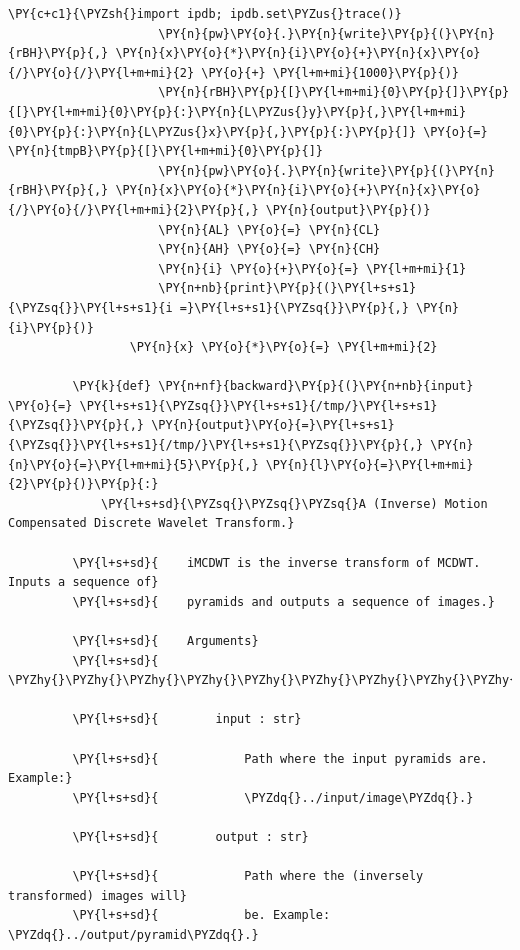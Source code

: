 {\begin{Verbatim}[commandchars=\\\{\}]
                     \PY{c+c1}{\PYZsh{}import ipdb; ipdb.set\PYZus{}trace()}
                     \PY{n}{pw}\PY{o}{.}\PY{n}{write}\PY{p}{(}\PY{n}{rBH}\PY{p}{,} \PY{n}{x}\PY{o}{*}\PY{n}{i}\PY{o}{+}\PY{n}{x}\PY{o}{/}\PY{o}{/}\PY{l+m+mi}{2} \PY{o}{+} \PY{l+m+mi}{1000}\PY{p}{)}
                     \PY{n}{rBH}\PY{p}{[}\PY{l+m+mi}{0}\PY{p}{]}\PY{p}{[}\PY{l+m+mi}{0}\PY{p}{:}\PY{n}{L\PYZus{}y}\PY{p}{,}\PY{l+m+mi}{0}\PY{p}{:}\PY{n}{L\PYZus{}x}\PY{p}{,}\PY{p}{:}\PY{p}{]} \PY{o}{=} \PY{n}{tmpB}\PY{p}{[}\PY{l+m+mi}{0}\PY{p}{]}
                     \PY{n}{pw}\PY{o}{.}\PY{n}{write}\PY{p}{(}\PY{n}{rBH}\PY{p}{,} \PY{n}{x}\PY{o}{*}\PY{n}{i}\PY{o}{+}\PY{n}{x}\PY{o}{/}\PY{o}{/}\PY{l+m+mi}{2}\PY{p}{,} \PY{n}{output}\PY{p}{)}
                     \PY{n}{AL} \PY{o}{=} \PY{n}{CL}
                     \PY{n}{AH} \PY{o}{=} \PY{n}{CH}
                     \PY{n}{i} \PY{o}{+}\PY{o}{=} \PY{l+m+mi}{1}
                     \PY{n+nb}{print}\PY{p}{(}\PY{l+s+s1}{\PYZsq{}}\PY{l+s+s1}{i =}\PY{l+s+s1}{\PYZsq{}}\PY{p}{,} \PY{n}{i}\PY{p}{)}
                 \PY{n}{x} \PY{o}{*}\PY{o}{=} \PY{l+m+mi}{2}
         
         \PY{k}{def} \PY{n+nf}{backward}\PY{p}{(}\PY{n+nb}{input} \PY{o}{=} \PY{l+s+s1}{\PYZsq{}}\PY{l+s+s1}{/tmp/}\PY{l+s+s1}{\PYZsq{}}\PY{p}{,} \PY{n}{output}\PY{o}{=}\PY{l+s+s1}{\PYZsq{}}\PY{l+s+s1}{/tmp/}\PY{l+s+s1}{\PYZsq{}}\PY{p}{,} \PY{n}{n}\PY{o}{=}\PY{l+m+mi}{5}\PY{p}{,} \PY{n}{l}\PY{o}{=}\PY{l+m+mi}{2}\PY{p}{)}\PY{p}{:}
             \PY{l+s+sd}{\PYZsq{}\PYZsq{}\PYZsq{}A (Inverse) Motion Compensated Discrete Wavelet Transform.}
         
         \PY{l+s+sd}{    iMCDWT is the inverse transform of MCDWT. Inputs a sequence of}
         \PY{l+s+sd}{    pyramids and outputs a sequence of images.}
         
         \PY{l+s+sd}{    Arguments}
         \PY{l+s+sd}{    \PYZhy{}\PYZhy{}\PYZhy{}\PYZhy{}\PYZhy{}\PYZhy{}\PYZhy{}\PYZhy{}\PYZhy{}}
         
         \PY{l+s+sd}{        input : str}
         
         \PY{l+s+sd}{            Path where the input pyramids are. Example:}
         \PY{l+s+sd}{            \PYZdq{}../input/image\PYZdq{}.}
         
         \PY{l+s+sd}{        output : str}
         
         \PY{l+s+sd}{            Path where the (inversely transformed) images will}
         \PY{l+s+sd}{            be. Example: \PYZdq{}../output/pyramid\PYZdq{}.}
         

\end{Verbatim}}
